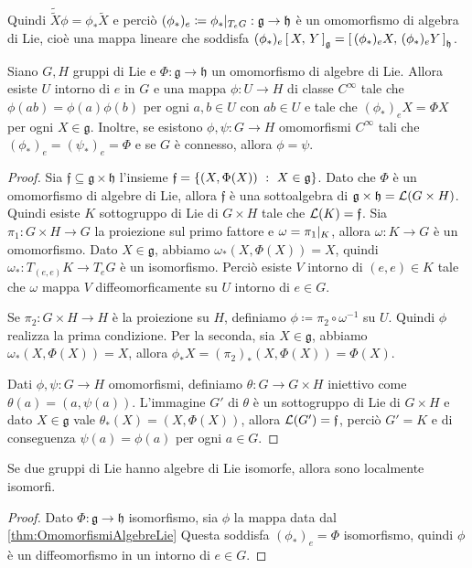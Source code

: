 Quindi $\tilde{\tilde X} \phi = \phi_*\tilde X$ e perciò $(\phi_*)_e\coloneqq \phi_*|_{T_eG}:\mathfrak g \to \mathfrak h$ è un omomorfismo di algebra di Lie, cioè una mappa lineare che soddisfa $(\phi_*)_e \left[\,X,\,Y\,\right] _{\mathfrak g} = \left[\, (\phi_*)_eX,\, (\phi_*)_eY \,\right]_{\mathfrak h}$.

\begin{theorem}\label{thm:OmomorfismiAlgebreLie}
	Siano $G,H$ gruppi di Lie e $\Phi: \mathfrak g \to \mathfrak h$ un omomorfismo di algebre di Lie. Allora esiste $U$ intorno di $e$ in $G$ e una mappa $\phi: U \to H$ di classe $C^\infty$ tale che $\phi(ab) = \phi(a) \phi(b)$ per ogni $a,b \in U$ con $ab \in U$ e tale che $(\phi_*)_e X = \Phi X$ per ogni $X\in\mathfrak g$.
	Inoltre, se esistono $\phi,\psi : G \to H$ omomorfismi $C^\infty$ tali che $(\phi_*)_e = (\psi_*)_e = \Phi$ e se $G$ è connesso, allora $\phi = \psi$.
\end{theorem}
\begin{proof}
	Sia $\mathfrak f \subseteq \mathfrak g \times \mathfrak h$ l'insieme $\mathfrak f = \{ (X,\Phi(X)) \ :\  X \in \mathfrak g \}$.
	Dato che $\Phi$ è un omomorfismo di algebre di Lie, allora $\mathfrak f$ è una sottoalgebra di $\mathfrak g \times \mathfrak h = \mathcal L(G\times H)$.
	Quindi esiste $K$ sottogruppo di Lie di $G\times H$ tale che $\mathcal L(K) = \mathfrak f$.
	Sia $\pi_1:G\times H \to G$ la proiezione sul primo fattore e $\omega = \pi_1|_ K$, allora $\omega: K \to G$ è un omomorfismo.
	Dato $X\in \mathfrak g$, abbiamo $\omega_*(X,\Phi(X)) = X$, quindi $\omega_*:T_{(e,e)}K\to T_e G$ è un isomorfismo.
	Perciò esiste $V$ intorno di $(e,e) \in K$ tale che $\omega$ mappa $V$ diffeomorficamente su $U$ intorno di $e\in G$.
	
	Se $\pi_2 : G\times H \to H$ è la proiezione su $H$, definiamo $\phi \coloneqq \pi_2 \circ \omega^{-1}$ su $U$. Quindi $\phi$ realizza la prima condizione. Per la seconda, sia $X\in\mathfrak g$, abbiamo $\omega_*(X,\Phi(X)) = X$, allora $\phi_*X = (\pi_2)_*(X,\Phi(X)) =\Phi(X)$.
	
	Dati $\phi,\psi:G\to H$ omomorfismi, definiamo $\theta:G \to G\times H$ iniettivo come $\theta(a) = (a,\psi(a))$. L'immagine $G'$ di $\theta$ è un sottogruppo di Lie di $G\times H$ e dato $X \in \mathfrak g$ vale $\theta_*(X) = (X,\Phi(X))$, allora $\mathcal L(G') = \mathfrak f$, perciò $G'=K$ e di conseguenza $\psi(a) = \phi(a)$ per ogni $a \in G$. 
\end{proof}



\begin{corollary} \label{cor:AlgebreIsomorfeLocIsomorfi}
	Se due gruppi di Lie hanno algebre di Lie isomorfe, allora sono localmente isomorfi.
\end{corollary}
\begin{proof}
	Dato $\Phi: \mathfrak g \to \mathfrak h$ isomorfismo, sia $\phi$ la mappa data dal \cref{thm:OmomorfismiAlgebreLie}
	Questa soddisfa $(\phi_*)_e = \Phi$ isomorfismo, quindi $\phi$ è un diffeomorfismo in un intorno di $e \in G$.
\end{proof}



